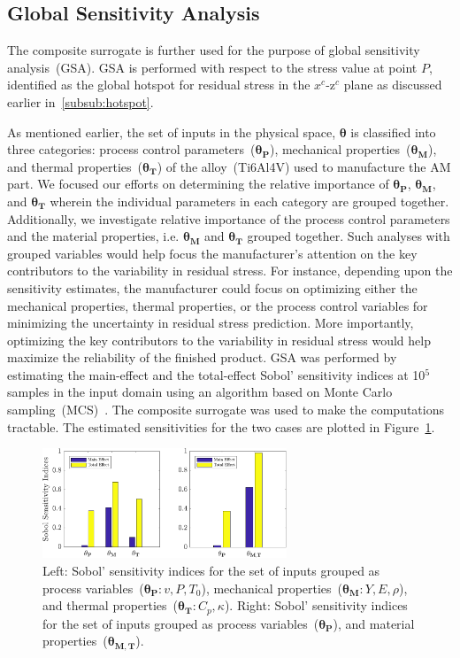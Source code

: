 \subsection{Global Sensitivity Analysis}
\label{sub:gsa}

The composite surrogate is further used for the purpose of global sensitivity analysis~(GSA). %
GSA is performed with respect to the stress value at point $P$, identified as the global hotspot
for residual stress in the $x^c$-z$^c$ plane as discussed earlier in~\ref{subsub:hotspot}. 

As mentioned earlier, the set of inputs in the physical space, $\bm{\theta}$ is classified into three
categories: process control parameters~($\bm{\theta_P}$), mechanical properties~($\bm{\theta_M}$), and
thermal properties~($\bm{\theta_T}$) of the alloy~(Ti6Al4V) used to manufacture the AM part. We focused
our efforts on determining the relative importance of $\bm{\theta_P}$, $\bm{\theta_M}$, and $\bm{\theta_T}$
wherein the individual parameters in each category are grouped together. Additionally, we investigate
relative importance of the process
control parameters and the material properties, i.e. $\bm{\theta_M}$ and $\bm{\theta_T}$ grouped together.
Such analyses with grouped variables would help focus the manufacturer's attention on the key
contributors to the variability in residual stress. For instance, depending upon the sensitivity estimates, the
manufacturer could focus on optimizing either the mechanical properties, thermal properties, or
the process control variables for minimizing the uncertainty in residual stress prediction. 
More importantly, optimizing the key contributors to the variability in residual stress would help maximize the reliability
of the finished product. 
 GSA was performed by estimating the main-effect and the total-effect Sobol' sensitivity
indices at 10$^5$ samples in the input domain using an algorithm based on 
Monte Carlo sampling~(MCS)~\cite{Sobol:2001}. The composite
surrogate was used to make the computations tractable. The estimated sensitivities for the two cases
are plotted in Figure~\ref{fig:gsa}.
%
\begin{figure}[htbp]
\begin{center}
\includegraphics[width=0.65\textwidth]{./Figures/grouped_GSA}
\end{center}
\caption{Left: Sobol' sensitivity indices for the set of inputs grouped as process variables~($\bm{\theta_P}:v,P,T_0$), 
mechanical properties~($\bm{\theta_M}:Y,E,\rho$), and thermal properties~($\bm{\theta_T}:C_p,\kappa$).
Right: Sobol' sensitivity indices for the set of inputs grouped as process variables~($\bm{\theta_P}$), and material 
properties~($\bm{\theta_{M,T}}$).}
\label{fig:gsa}
\end{figure}
